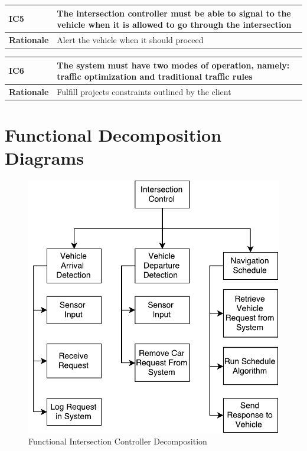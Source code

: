 \documentclass [11pt]{article}
\begin{document}
\begin{longtable}{| p{ } | p{ } | }\hline 
\rowcolor{tableCell}\textbf{IC5} & The intersection controller must be able to signal to the vehicle when it is allowed to go through the intersection \\ \hline
\textbf{Rationale} &  Alert the vehicle when it should proceed\\ \hline 
\end{longtable}

\begin{longtable}{| p{ } | p{ } | }\hline 
\rowcolor{tableCell}\textbf{IC6} & The system must have two modes of operation, namely: traffic optimization and traditional traffic rules \\ \hline
\textbf{Rationale} & Fulfill projects constraints outlined by the client \\ \hline 
\end{longtable}



\section{Functional Decomposition Diagrams}
\begin{figure} [h!]
	\caption{Functional Intersection Controller Decomposition}\bigskip
	\centering
	\includegraphics [scale =.8] {figures/function_decomp_IC.pdf}
	
\end{figure}
\end{document}
